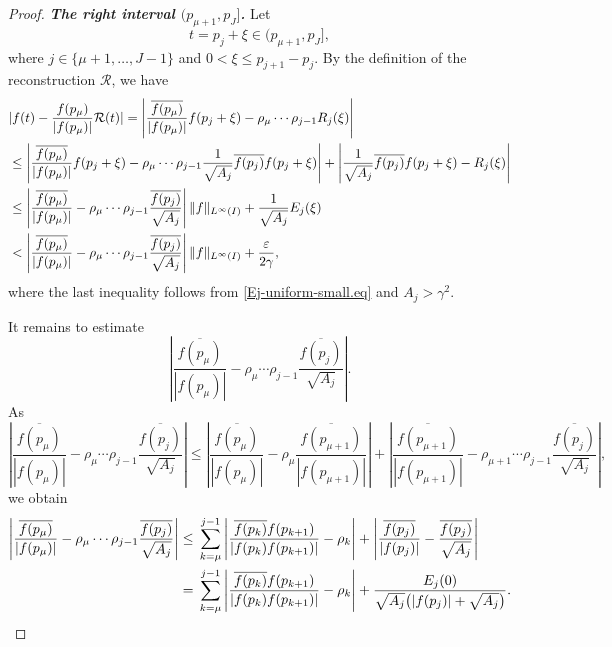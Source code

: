 \documentclass[11pt, reqno]{amsart}
\numberwithin{equation}{section}
\begin{document}
\begin{proof}
\medskip
\noindent
\emph{\textbf{The right interval $(p_{\mu+1},p_J]$.}}
Let
$$ t=p_j+\xi\in(p_{\mu+1},p_J],$$
where $ j\in\{\mu+1,\dots,J-1\}$ and $0<\xi\le p_{j+1}-p_j$.  By the definition of the reconstruction $\mathcal R$, we have 
 \begin{align}\label{eq:right-interval-first}%
      &  | f(t) {} - \frac{f(p_{\mu})}{|f(p_{\mu})|} \mathcal{R}(t) |  = \left| \frac{\overline{f(p_{\mu})}}{|f(p_{\mu})|} f(p_j+\xi) -  \rho_{\mu} \cdots \rho_{j-1} R_j(\xi) \right| \notag\\
        {}& \le \left| \frac{\overline{f(p_{\mu})} }{|f(p_{\mu})| } f(p_j+\xi) - \rho_{\mu} \cdots \rho_{j-1} \frac{1}{\sqrt{A_j}} \overline{f(p_j)} f(p_j+\xi) \right| + \left| \frac{1}{\sqrt{A_j}} \overline{f(p_j)} f(p_j+\xi) -  R_j(\xi) \right| \notag\\
        {}& \le \left| \frac{\overline{f(p_{\mu})}}{|f(p_{\mu})|} - \rho_{\mu} \cdots \rho_{j-1} \frac{\overline{f(p_j)}}{\sqrt{A_j}}  \right| \|f\|_{L^{\infty} (I)} + \frac{1}{\sqrt{A_j}} E_j(\xi) \notag\\
        {}& < \left| \frac{\overline{f(p_{\mu})}}{|f(p_{\mu})|} - \rho_{\mu} \cdots \rho_{j-1} \frac{\overline{f(p_j)}}{\sqrt{A_j}}   \right| \|f\|_{L^{\infty} (I)} +  \frac{\varepsilon}{2\gamma},
    \end{align}
    where the last inequality follows from \eqref{Ej-uniform-small.eq} and $A_j > \gamma^2$.

It remains to estimate 
$$ \left| \frac{\overline{f(p_\mu)}}{|f(p_\mu)|} - \rho_\mu\cdots\rho_{j-1}\frac{\overline{f(p_j)}}{\sqrt{A_j}}
\right|.$$
As $$ \left| \frac{\overline{f(p_\mu)}}{|f(p_\mu)|} - \rho_\mu\cdots\rho_{j-1}\frac{\overline{f(p_j)}}{\sqrt{A_j}}\right|
        \le \left|\frac{\overline{f(p_\mu)}}{|f(p_\mu)|}- \rho_{\mu} \frac{\overline{f(p_{\mu+1})}}{|f(p_{\mu+1})|} \right| + \left| \frac{\overline{f(p_{\mu+1})}}{|f(p_{\mu+1})|} - \rho_{\mu+1} \cdots \rho_{j-1} \frac{\overline{f(p_j)} }{\sqrt{A_j}} \right|,$$  
 we obtain
\begin{align}\label{eq:right-phase-split}
\left| \frac{\overline{f(p_\mu)}}{|f(p_\mu)|} - \rho_\mu\cdots\rho_{j-1}\frac{\overline{f(p_j)}}{\sqrt{A_j}} \right|
   \le {}& \sum_{k=\mu}^{j-1} \left| \frac{\overline{f(p_k)} f(p_{k+1}) }{|f(p_k) f(p_{k+1})|} - \rho_k \right| + \left| \frac{\overline{f(p_j)}}{|f(p_j)|} - \frac{\overline{f(p_j)}}{\sqrt{A_j}} \right| \notag\\
= {}& \sum_{k=\mu}^{j-1} \left| \frac{\overline{f(p_k)}f(p_{k+1})}{|f(p_k)f(p_{k+1})|} -\rho_k\right|
+\frac{E_j(0)}{\sqrt{A_j}\bigl(|f(p_j)|+\sqrt{A_j}\bigr)}. 
\end{align}
 

\end{proof}
\end{document}
